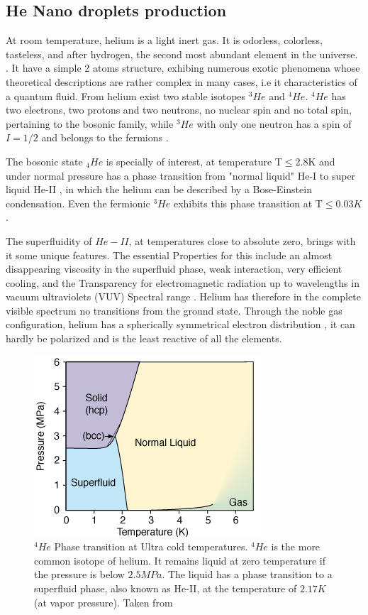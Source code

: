 \subsection{He Nano droplets production}

At room temperature, helium is a light inert gas. It is odorless, colorless, tasteless, and after hydrogen, the second most abundant element in the universe.  \cite{enss_low-temperature_2005}. It have a simple 2 atoms structure, exhibing numerous exotic phenomena whose theoretical descriptions are rather complex in many cases, i.e it characteristics of  a quantum fluid. From helium exist  two stable isotopes $^{3}He$ and $^{4}He$.  $^{4}He$ has two electrons, two protons and two neutrons, no nuclear spin and no total spin, pertaining to the bosonic family, while $^{3}He$ with only one neutron has a spin of $I = 1/2$ and belongs to the fermions \cite{atkins_liquid_2014}.

The bosonic state $_{4}He$ is specially of interest, at  temperature T$\leqslant$2.8K and under normal pressure has a phase transition from "normal liquid" He-I to super liquid He-II \cite{swenson_liquid-solid_1950}, in which the helium can be described by a Bose-Einstein condensation. Even the fermionic $^{3}He$ exhibits this phase transition at T$\leqslant 0.03K$ \cite{halperin_properties_1978}.

The superfluidity of $He-II$, at temperatures close to absolute zero, brings with it some unique features. The essential Properties for this include an almost disappearing viscosity in the superfluid phase, weak interaction, very efficient cooling, and the Transparency for electromagnetic radiation up to wavelengths in vacuum ultraviolets (VUV) Spectral range \cite{enss_low-temperature_2005}. Helium has therefore in the complete visible spectrum no transitions from the ground state. Through the noble gas configuration, helium has a spherically symmetrical electron distribution \cite{lewis_helium_2014}, it can hardly be polarized and is the least reactive of all the elements.

\begin{figure}[hbtp]
\caption{$^{4}He$ Phase transition at Ultra cold temperatures. $^{4}He$ is the more common isotope of helium. It remains liquid at zero temperature if the pressure is below $2.5 MPa$. The liquid has a phase transition to a superfluid phase, also known as He-II, at the temperature of $2.17 K$ (at vapor pressure). Taken from \cite{noauthor_helium_nodate}}
\centering
\includegraphics[scale=1]{../Images/He_temp_phases.png}
\end{figure}


